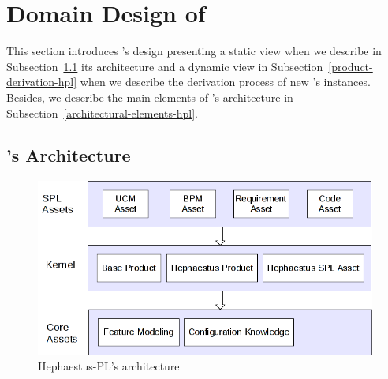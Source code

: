 
\section{Domain Design of \hpl}
\label{sec:domainDesign}

This section introduces \hpl's design presenting a static view when we describe in Subsection~\ref{architectural-view-hpl} its architecture and a dynamic view in Subsection~\ref{product-derivation-hpl} when we describe the derivation process of new \hpl's instances. Besides, we describe the main elements of \hpl's architecture in Subsection~\ref{architectural-elements-hpl}.


\subsection{\hpl's Architecture} \label{architectural-view-hpl}

%
%



\begin{figure}[bth]
\begin{center}
\includegraphics[scale=0.5]{imagens/architecture-hpl.png}
\end{center}
\caption{Hephaestus-PL's architecture}
\label{fig:architecture-hpl}
\end{figure}

